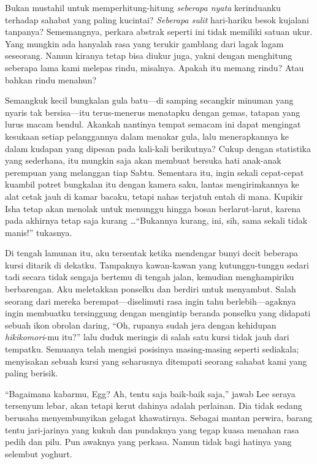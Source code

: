 \documentclass[smalldemyvopaper,11pt,twoside,onecolumn,openright,extrafontsizes]{memoir}
\begin{document}

Bukan mustahil untuk memperhitung-hitung \textit{seberapa nyata} kerinduanku terhadap sahabat yang paling kucintai? \textit{Seberapa sulit} hari-hariku besok kujalani tanpanya? Sememangnya, perkara abstrak seperti ini tidak memiliki satuan ukur. Yang mungkin ada hanyalah rasa yang terukir gamblang dari lagak lagam seseorang. Namun kiranya tetap bisa diukur juga, yakni dengan menghitung seberapa lama kami melepas rindu, misalnya. Apakah itu memang rindu? Atau bahkan rindu menahun?


Semangkuk kecil bungkalan gula batu---di samping secangkir minuman yang nyaris tak bersisa---itu terus-menerus menatapku dengan gemas, tatapan yang lurus macam bendul. Akankah nantinya tempat semacam ini dapat mengingat kesukaan setiap pelanggannya dalam menakar gula, lalu menerapkannya ke dalam kudapan yang dipesan pada kali-kali berikutnya? Cukup dengan statistika yang sederhana, itu mungkin saja akan membuat bersuka hati anak-anak perempuan yang melanggan tiap Sabtu. Sementara itu, ingin sekali cepat-cepat kuambil potret bungkalan itu dengan kamera saku, lantas mengirimkannya ke alat cetak jauh di kamar bacaku, tetapi nahas terjatuh entah di mana. Kupikir Isha tetap akan menolak untuk menunggu hingga bosan berlarut-larut, karena pada akhirnya tetap saja kurang \dots ``Bukannya kurang, ini, sih, sama sekali tidak manis!'' tukasnya.


Di tengah lamunan itu, aku tersentak ketika mendengar bunyi decit beberapa kursi ditarik di dekatku. Tampaknya kawan-kawan yang kutunggu-tunggu sedari tadi secara tidak sengaja bertemu di tengah jalan, kemudian menghampiriku berbarengan. Aku meletakkan ponselku dan berdiri untuk menyambut. Salah seorang dari mereka berempat---diselimuti rasa ingin tahu berlebih---agaknya ingin membuatku tersinggung dengan mengintip beranda ponselku yang didapati sebuah ikon obrolan daring, ``Oh, rupanya sudah jera dengan kehidupan \textit{hikikomori}-mu itu?'' lalu duduk meringis di salah satu kursi tidak jauh dari tempatku. Semuanya telah mengisi posisinya masing-masing seperti sediakala; menyisakan sebuah kursi yang seharusnya ditempati seorang sahabat kami yang paling berisik.

``Bagaimana kabarmu, Egg? Ah, tentu saja baik-baik saja,'' jawab Lee seraya tersenyum lebar, akan tetapi kerut dahinya adalah perlainan. Dia tidak sedang berusaha menyembunyikan gelagat khawatirnya. Sebagai mantan perwira, barang tentu jari-jarinya yang kukuh dan pundaknya yang tegap kuasa menahan rasa pedih dan pilu. Pun awaknya yang perkasa. Namun tidak bagi hatinya yang selembut yoghurt.
\end{document}
